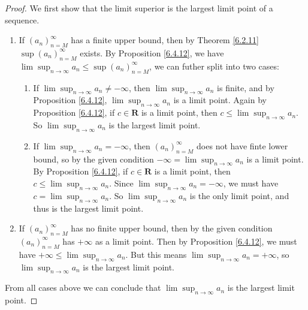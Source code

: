 \begin{proof}
    We first show that the limit superior is the largest limit point of a sequence.
    \begin{enumerate}
        \item If \((a_n)_{n = M}^\infty\) has a finite upper bound, then by Theorem \ref{6.2.11} \(\sup(a_n)_{n = M}^\infty\) exists.
              By Proposition \ref{6.4.12}, we have \(\lim\sup_{n \to \infty} a_n \leq \sup(a_n)_{n = M}^\infty\), we can futher split into two cases:
              \begin{enumerate}[label=(\Roman*)]
                  \item If \(\lim\sup_{n \to \infty} a_n \neq -\infty\), then \(\lim\sup_{n \to \infty} a_n\) is finite, and by Proposition \ref{6.4.12}, \(\lim\sup_{n \to \infty} a_n\) is a limit point.
                        Again by Proposition \ref{6.4.12}, if \(c \in \mathbf{R}\) is a limit point, then \(c \leq \lim\sup_{n \to \infty} a_n\).
                        So \(\lim\sup_{n \to \infty} a_n\) is the largest limit point.
                  \item If \(\lim\sup_{n \to \infty} a_n = -\infty\), then \((a_n)_{n = M}^\infty\) does not have finte lower bound, so by the given condition \(-\infty = \lim\sup_{n \to \infty} a_n\) is a limit point.
                        By Proposition \ref{6.4.12}, if \(c \in \mathbf{R}\) is a limit point, then \(c \leq \lim\sup_{n \to \infty} a_n\).
                        Since \(\lim\sup_{n \to \infty} a_n = -\infty\), we must have \(c = \lim\sup_{n \to \infty} a_n\).
                        So \(\lim\sup_{n \to \infty} a_n\) is the only limit point, and thus is the largest limit point.
              \end{enumerate}
        \item If \((a_n)_{n = M}^\infty\) has no finite upper bound, then by the given condition \((a_n)_{n = M}^\infty\) has \(+\infty\) as a limit point.
              Then by Proposition \ref{6.4.12}, we must have \(+\infty \leq \lim\sup_{n \to \infty} a_n\).
              But this means \(\lim\sup_{n \to \infty} a_n = +\infty\), so \(\lim\sup_{n \to \infty} a_n\) is the largest limit point.
    \end{enumerate}
    From all cases above we can conclude that \(\lim\sup_{n \to \infty} a_n\) is the largest limit point.


\end{proof}
